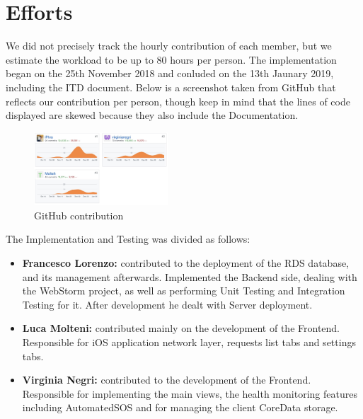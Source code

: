 \documentclass[titlepage]{article}
\begin{document}
	\pagebreak
	\section{Efforts}
	We did not precisely track the hourly contribution of each member, but we estimate the workload to be up to 80 hours per person. \newline
	The implementation began on the 25th November 2018 and conluded on the 13th Jaunary 2019, including the ITD document. Below is a screenshot taken from GitHub that reflects our contribution per person, though keep in mind that the lines of code displayed are skewed because they also include the Documentation. 
	
	\begin{figure}[H]
		\center
		\includegraphics[width=5cm]{GitHub.png}
		\caption{GitHub contribution}
		\label{fig:Hist}
	\end{figure}
	
	The Implementation and Testing was divided as follows:
	\begin{itemize}
		\item {\bf Francesco Lorenzo:}
		contributed to the deployment of the RDS database, and its management afterwards.
		Implemented the Backend side, dealing with the WebStorm project, as well as performing Unit Testing and Integration Testing for it. After development he dealt with Server deployment.
		
		\item {\bf Luca Molteni:}
		contributed mainly on the development of the Frontend. Responsible for iOS application network layer, requests list tabs and settings tabs.
		
		\item {\bf Virginia Negri:} 
		contributed to the development of the Frontend. Responsible for implementing the main views, the health monitoring features including AutomatedSOS and for managing the client CoreData storage.
	\end{itemize}
	
	
\end{document}
